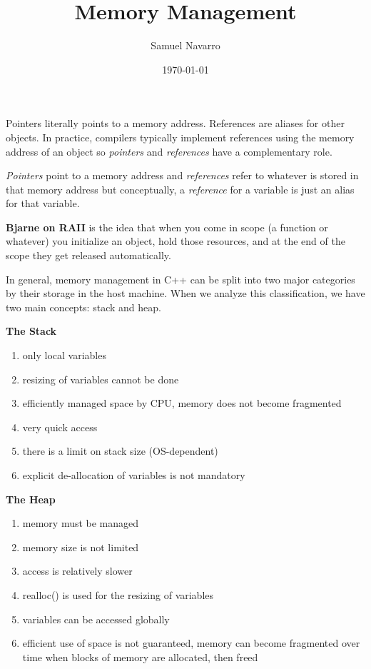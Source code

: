 \documentclass[11pt, a4paper]{article}
\begin{document}
\title{Memory Management}
\author{Samuel Navarro}
\date{\today}
\maketitle
\tableofcontents{}
	






Pointers literally points to a memory address. References are aliases for other objects. In practice, compilers typically implement references using the memory address of an object so \textit{pointers} and \textit{references} have a complementary role. 


\textit{Pointers} point to a memory address and \textit{references} refer to whatever is stored in that memory address but conceptually, a \textit{reference} for a variable is just an alias for that variable. 


\textbf{Bjarne on RAII} is the idea that when  you come in scope (a function or whatever) you initialize an object, hold those resources, and at the end of the scope they get released automatically. 

In general, memory management in C++ can be split into two major categories by their storage in the host machine. When we analyze this classification, we have two main concepts: stack and heap.

\textbf{The Stack}

\begin{enumerate}
	\item only local variables
	\item resizing of variables cannot be done
	\item efficiently managed space by CPU, memory does not become fragmented
	\item very quick access
	\item there is a limit on stack size (OS-dependent)
	\item explicit de-allocation of variables is not mandatory
\end{enumerate}

\textbf{The Heap}

\begin{enumerate}
	\item memory must be managed
	\item memory size is not limited
	\item access is relatively slower
	\item realloc() is used for the resizing of variables
	\item variables can be accessed globally
	\item efficient use of space is not guaranteed, memory can become fragmented over time when blocks of memory are allocated, then freed
\end{enumerate}
\end{document}
